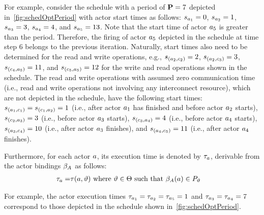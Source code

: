 For example, consider the schedule with a period of $\mathbf{P} = 7$ depicted in~\cref{fig:schedOptPeriod} with actor start times as follows: $s_{a_1} = 0$, $s_{a_2} = 1$, $s_{a_3} = 3$, $s_{a_4} = 4$, and $s_{a_5} = 13$.
Note that the start time of actor $a_5$ is greater than the period.
Therefore, the firing of actor $a_5$ depicted in the schedule at time step $6$ belongs to the previous iteration.
Naturally, start times also need to be determined for the read and write operations, e.g., $s_{(a_2,c_2)} = 2$, $s_{(a_2,c_3)} = 3$, $s_{(c_4,a_5)} = 11$, and $s_{(c_5,a_5)} = 12$ for the write and read operations shown in the schedule.
The read and write operations with assumed zero communication time (i.e., read and write operations not involving any interconnect resource), which are not depicted in the schedule, have the following start times: $s_{(a_1,c_1)} = s_{(c_1,a_2)} = 1$ (i.e., after actor $a_1$ has finished and before actor $a_2$ starts), $s_{(c_2,a_3)} = 3$ (i.e., before actor $a_3$ starts), $s_{(c_3,a_4)} = 4$ (i.e., before actor $a_4$ starts), $s_{(a_3,c_4)} = 10$ (i.e., after actor $a_3$ finishes), and $s_{(a_4,c_5)} = 11$ (i.e., after actor $a_4$ finishes).

Furthermore, for each actor $a$, its execution time is denoted by $\tau_a$, derivable from the actor bindings $\beta_A$ as follows:
\begin{align}
  \tau_a     = & \tau(a, \vartheta) \textrm{ where } \vartheta \in \Theta \textrm{ such that } \beta_A(a) \in P_\vartheta
\end{align}
\par
For example, the actor execution times $\tau_{a_1} = \tau_{a_2} = \tau_{a_5} = 1$ and $\tau_{a_3} = \tau_{a_4} = 7$ correspond to those depicted in the schedule shown in~\cref{fig:schedOptPeriod}.


